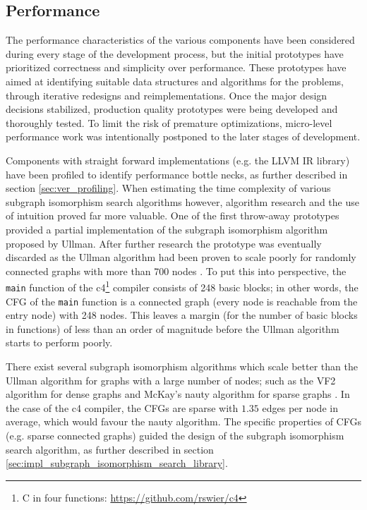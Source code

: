 
\subsection{Performance}
\label{sec:ver_performance}

The performance characteristics of the various components have been considered during every stage of the development process, but the initial prototypes have prioritized correctness and simplicity over performance. These prototypes have aimed at identifying suitable data structures and algorithms for the problems, through iterative redesigns and reimplementations. Once the major design decisions stabilized, production quality prototypes were being developed and thoroughly tested. To limit the risk of premature optimizations, micro-level performance work was intentionally postponed to the later stages of development.

Components with straight forward implementations (e.g. the LLVM IR library) have been profiled to identify performance bottle necks, as further described in section \ref{sec:ver_profiling}. When estimating the time complexity of various subgraph isomorphism search algorithms however, algorithm research and the use of intuition proved far more valuable. One of the first throw-away prototypes provided a partial implementation of the subgraph isomorphism algorithm proposed by Ullman. After further research the prototype was eventually discarded as the Ullman algorithm had been proven to scale poorly for randomly connected graphs with more than 700 nodes \cite{iso_performance_comparison}. To put this into perspective, the \texttt{main} function of the c4\footnote{C in four functions: \url{https://github.com/rswier/c4}} compiler consists of 248 basic blocks; in other words, the CFG of the \texttt{main} function is a connected graph (every node is reachable from the entry node) with 248 nodes. This leaves a margin (for the number of basic blocks in functions) of less than an order of magnitude before the Ullman algorithm starts to perform poorly.

There exist several subgraph isomorphism algorithms which scale better than the Ullman algorithm for graphs with a large number of nodes; such as the VF2 algorithm for dense graphs and McKay's nauty algorithm for sparse graphs \cite{iso_performance_comparison,subgraph_isomorphism_algorithms}. In the case of the c4 compiler, the CFGs are sparse with $ 1.35 $ edges per node in average, which would favour the nauty algorithm. The specific properties of CFGs (e.g. sparse connected graphs) guided the design of the subgraph isomorphism search algorithm, as further described in section \ref{sec:impl_subgraph_isomorphism_search_library}.


